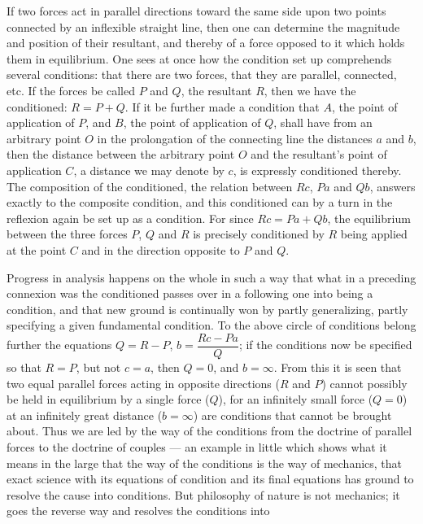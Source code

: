 \documentclass[12pt,a4paper]{book}
\begin{document}
If two forces act in parallel directions toward the same side upon two points connected by an
inflexible straight line, then one can determine the magnitude and position of their
resultant, and thereby of a force opposed to it which holds them in equilibrium. One sees at
once how the condition set up comprehends several conditions: that there are two forces, that
they are parallel, connected, etc. If the forces be called $P$ and $Q$, the resultant $R$,
then we have the conditioned: $R = P + Q$. If it be further made a condition that $A$, the
point of application of $P$, and $B$, the point of application of $Q$, shall have from an
arbitrary point $O$ in the prolongation of the connecting line the distances $a$ and $b$, then
the distance between the arbitrary point $O$ and the resultant's point of application $C$, a
distance we may denote by $c$, is expressly conditioned thereby. The composition of the
conditioned, the relation between $Rc$, $Pa$ and $Qb$, answers exactly to the composite
condition, and this conditioned can by a turn in the reflexion again be set up as a condition.
For since $Rc = Pa + Qb$, the equilibrium between the three forces $P$, $Q$ and $R$ is
precisely conditioned by $R$ being applied at the point $C$ and in the direction opposite to
$P$ and $Q$.

Progress in analysis happens on the whole in such a way that what in a preceding connexion was
the conditioned passes over in a following one into being a condition, and that new ground is
continually won by partly generalizing, partly specifying a given fundamental condition. To
the above circle of conditions belong further the equations $Q = R - P$,
$b = \dfrac{Rc - Pa}{Q}$; if the conditions now be specified so that $R = P$, but not
$c = a$, then $Q = 0$, and $b = \infty$. From this it is seen that two equal parallel forces
acting in opposite directions ($R$ and $P$) cannot possibly be held in equilibrium by a single
force ($Q$), for an infinitely small force ($Q = 0$) at an infinitely great distance
($b = \infty$) are conditions that cannot be brought about. Thus we are led
by the way of the conditions from the doctrine of parallel forces to the doctrine of couples
--- an example in little which shows what it means in the large that the way of the conditions
is the way of mechanics, that exact science with its equations of condition and its final
equations has ground to resolve the cause into conditions. But philosophy of nature is not
mechanics; it goes the reverse way and resolves the conditions into
\end{document}
